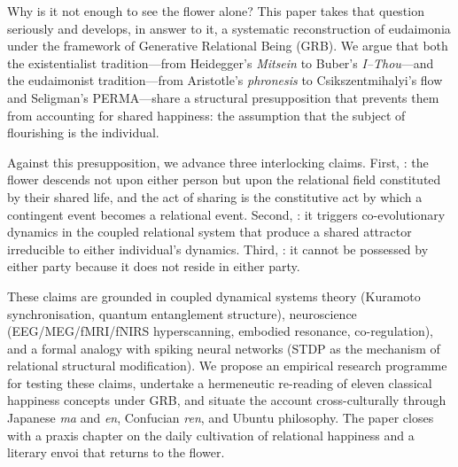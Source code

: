 Why is it not enough to see the flower alone? This paper takes that question seriously and develops, in answer to it, a systematic reconstruction of eudaimonia under the framework of Generative Relational Being (GRB). We argue that both the existentialist tradition---from Heidegger's \emph{Mitsein} to Buber's \emph{I--Thou}---and the eudaimonist tradition---from Aristotle's \emph{phronesis} to Csikszentmihalyi's flow and Seligman's PERMA---share a structural presupposition that prevents them from accounting for shared happiness: the assumption that the subject of flourishing is the individual.

Against this presupposition, we advance three interlocking claims. First, : the flower descends not upon either person but upon the relational field constituted by their shared life, and the act of sharing is the constitutive act by which a contingent event becomes a relational event. Second, : it triggers co-evolutionary dynamics in the coupled relational system that produce a shared attractor irreducible to either individual's dynamics. Third, : it cannot be possessed by either party because it does not reside in either party.

These claims are grounded in coupled dynamical systems theory (Kuramoto synchronisation, quantum entanglement structure), neuroscience (EEG/MEG/fMRI/fNIRS hyperscanning, embodied resonance, co-regulation), and a formal analogy with spiking neural networks (STDP as the mechanism of relational structural modification). We propose an empirical research programme for testing these claims, undertake a hermeneutic re-reading of eleven classical happiness concepts under GRB, and situate the account cross-culturally through Japanese \emph{ma} and \emph{en}, Confucian \emph{ren}, and Ubuntu philosophy. The paper closes with a praxis chapter on the daily cultivation of relational happiness and a literary envoi that returns to the flower.
